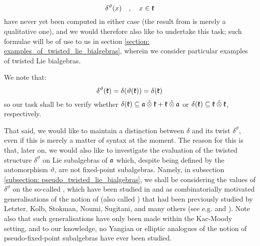             $$\delta^{\vartheta}(x) \quad, \quad x \in \mathfrak{k}$$
        have never yet been computed in either case (the result from \cite{schrader_integrable_systems_from_classical_reflection_equations} is merely a qualitative one), and we would therefore also like to undertake this task; such formulae will be of use to us in section \ref{section: examples_of_twisted_lie_bialgebras}, wherein we consider particular examples of twisted Lie bialgebras.
        \begin{remark}
            We note that:
                $$\delta^{\vartheta}( \mathfrak{k} ) = \delta( \vartheta( \mathfrak{k} ) ) = \delta( \mathfrak{k} )$$
            so our task shall be to verify whether $\delta(\k) \subseteq \a \hattensor \k + \k \hattensor \a$ or $\delta(\k) \subseteq \k \hattensor \k$, respectively.
            
            That said, we would like to maintain a distinction between $\delta$ and its twist $\delta^{\vartheta}$, even if this is merely a matter of syntax at the moment. The reason for this is that, later on, we would also like to investigate the evaluation of the twisted structure $\delta^{\vartheta}$ on Lie subalgebras of $\mathfrak{a}$ which, despite being defined by the automorphism $\vartheta$, are not fixed-point subalgebras. Namely, in subsection \ref{subsection: pseudo_twisted_lie_bialgebras}, we shall be considering the values of $\delta^{\vartheta}$ on the so-called , which have been studied in \cite{regelskis_vlaar_finite_QSPs_via_generalised_satake_diagrams} and \cite{regelskis_vlaar_kac_moody_pseudo_symmetric_pairs} as combinatorially motivated generalisations of the notion of  (also called ) that had been previously studied by Letzter, Kolb, Stokman, Noumi, Sugitani, and many others (see e.g. \cite{letzter_coideal_subalgebras_and_QSPs} and \cite{kolb_kac_moody_QSPs}). Note also that such generalisations have only been made within the Kac-Moody setting, and to our knowledge, no Yangian or elliptic analogues of the notion of pseudo-fixed-point subalgebras have ever been studied.
        \end{remark}
        
